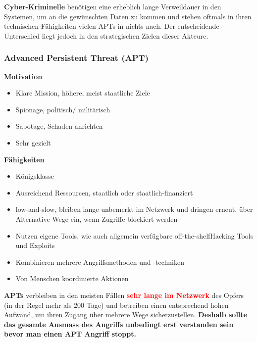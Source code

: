 \textbf{Cyber-Kriminelle} benötigen eine erheblich lange Verweildauer in den Systemen, um an die gewünschten Daten zu kommen und stehen oftmals in ihren technischen Fähigkeiten vielen APTs in nichts nach. Der entscheidende
Unterschied liegt jedoch in den strategischen Zielen dieser Akteure.

\subsubsection{Advanced Persistent Threat (APT)}
\begin{minipage}{0.5\linewidth}
    \textbf{Motivation}
    \begin{itemize}
        \item Klare Mission, höhere, meist staatliche Ziele
        \item Spionage, politisch/ militärisch
        \item Sabotage, Schaden anrichten
        \item Sehr gezielt
    \end{itemize}
\end{minipage}
\begin{minipage}{0.45\linewidth}
    \textbf{Fähigkeiten}\\
    \begin{itemize}
        \item Königsklasse
        \item Ausreichend Ressourcen, staatlich oder staatlich-finanziert
        \item \glqq low-and-slow\grqq, bleiben lange unbemerkt im Netzwerk und dringen erneut, über Alternative Wege ein, wenn Zugriffe blockiert werden
        \item Nutzen eigene Tools, wie auch allgemein verfügbare \glqq off-the-shelf\grqq Hacking Tools und Exploits
        \item Kombinieren mehrere Angriffsmethoden und -techniken
        \item Von Menschen koordinierte Aktionen\\
    \end{itemize}
\end{minipage}

\textbf{APTs} verbleiben in den meisten Fällen \textcolor{red}{\textbf{sehr lange im Netzwerk}} des Opfers (in der Regel mehr als 200 Tage) und betreiben einen entsprechend hohen Aufwand, um ihren Zugang über mehrere Wege sicherzustellen. 
\textbf{Deshalb sollte das gesamte Ausmass des Angriffs unbedingt erst verstanden sein bevor man einen APT Angriff stoppt.}

